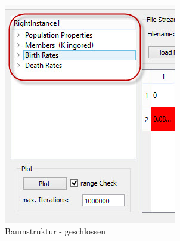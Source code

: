 \documentclass[11pt, a4paper, german]{article}
\theoremstyle{plain}
\begin{document}
	\begin{center}
	\begin{minipage}{0.45\textwidth}
		\begin{figure}[H]
			\centering
			\includegraphics[width=1\linewidth]{./Pictures/MainWindow_ParameterBaum_zu}
			\caption[MainWindow_Parameter]{Baumstruktur - geschlossen}
			\label{Baumstruktur_geschlossen}
		\end{figure}
	\end{minipage} $ \quad $
	\begin{minipage}{0.45\textwidth}
		\begin{figure}[H]
			\centering

\end{figure}
\end{minipage}
\end{center}
\end{document}
